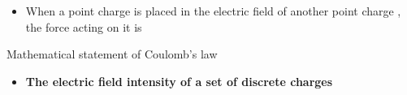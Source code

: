 \begin{ELimportant}{}


\end{ELimportant}

\begin{ELjoin}

\begin{itemize}
\tightlist
\item
  When a point charge  is placed in the electric field of another point charge , the force acting on it is
\end{itemize}

\begin{ELimportant}{Mathematical statement of Coulomb's law}


\end{ELimportant}

\end{ELjoin}

\begin{ELunit}


\end{ELunit}

\begin{ELjoin}

\begin{itemize}
\tightlist
\item
  \textbf{The electric field intensity of a set of discrete charges}
\end{itemize}

\begin{ELimportant}{}


\end{ELimportant}

\end{ELjoin}

